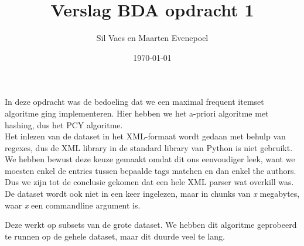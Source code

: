 \documentclass[11pt]{article}
\author{Sil Vaes en Maarten Evenepoel}
\date{\today}
\title{Verslag BDA opdracht 1}
\begin{document}
\maketitle
\setlength\parindent{0pt}

In deze opdracht was de bedoeling dat we een maximal frequent itemset algoritme ging implementeren. Hier hebben we het a-priori algoritme met hashing, dus het PCY algoritme.\\


Het inlezen van de dataset in het XML-formaat wordt gedaan met behulp van regexes, dus de XML library in de standard library van Python is niet gebruikt. We hebben bewust deze keuze gemaakt omdat dit ons eenvoudiger leek, want we moesten enkel de entries tussen bepaalde tags matchen en dan enkel the authors. Dus we zijn tot de conclusie gekomen dat een hele XML parser wat overkill was.\\


De dataset wordt ook niet in een keer ingelezen, maar in chunks van \emph{x} megabytes, waar \emph{x} een commandline argument is.

Deze werkt op subsets van de grote dataset. We hebben dit algoritme geprobeerd te runnen op de gehele dataset, maar dit duurde veel te lang.
\end{document}
